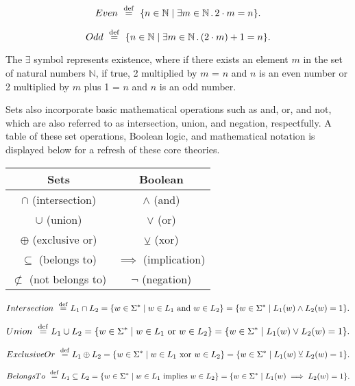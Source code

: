 \documentclass{article}
\begin{document}
 $$Even \ \stackrel{\rm def}{=} \ \{ n\in\mathbb N \mid \exists  m\in\mathbb N\,.\, 2\cdot m = n \}.$$

$$Odd \ \stackrel{\rm def}{=} \ \{ n\in\mathbb N \mid \exists  m\in\mathbb N\,.\, (2\cdot m) + 1 = n \}.$$

\noindent The $\exists$ symbol represents existence, where if there exists an element $m$ in the set of natural numbers $\mathbb N$, if true, 2 multiplied by $m$ = $n$ and $n$ is an even number or 2 multiplied by $m$ plus 1 = $n$ and $n$ is an odd number. 

\medskip\noindent
 Sets also incorporate basic mathematical operations such as and, or, and not, which are also referred to as intersection, union, and negation, respectfully. A table of these set operations, Boolean logic, and mathematical notation is displayed below for a refresh of these core theories.

\begin{center}
\begin{tabular}{|c | c|} 
 \hline
 Sets & Boolean \\ [0.5ex] 
 \hline
 $\cap$ (intersection) & $\wedge$ (and)  \\ 
 \hline
 $\cup$ (union) & $\lor$ (or)  \\
 \hline
 $\oplus$ (exclusive or) & $\veebar$ (xor)  \\
 \hline
 $\subseteq$ (belongs to) & $\implies$ (implication) \\
 \hline
 $\not\subset$ (not belongs to) & $\neg$ (negation) \\ [1ex] 
 \hline
\end{tabular}
\end{center}

 $$ Intersection \ \stackrel{\rm def}{=} L_1\cap L_2 = \{w\in\Sigma^\ast \mid w\in L_1 \textrm{ and } w\in L_2\}= \{w\in\Sigma^\ast \mid L_1(w) \wedge L_2(w) = 1\}.$$

 $$ Union \ \stackrel{\rm def}{=} L_1\cup L_2 = \{w\in\Sigma^\ast \mid w\in L_1 \textrm{ or } w\in L_2\}= \{w\in\Sigma^\ast \mid L_1(w) \lor L_2(w) = 1\}.$$

 $$ Exclusive Or \ \stackrel{\rm def}{=} L_1\oplus L_2 = \{w\in\Sigma^\ast \mid w\in L_1 \textrm{ xor } w\in L_2\}= \{w\in\Sigma^\ast \mid L_1(w) \veebar L_2(w) = 1\}.$$

 $$ Belongs To \ \stackrel{\rm def}{=} L_1\subseteq L_2 = \{w\in\Sigma^\ast \mid w\in L_1 \textrm{ implies } w\in L_2\}= \{w\in\Sigma^\ast \mid L_1(w) \implies L_2(w) = 1\}.$$
\end{document}
